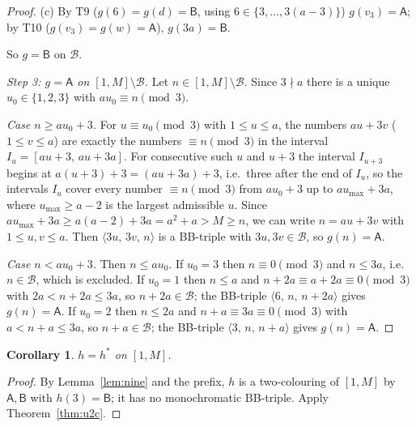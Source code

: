 \documentclass[11pt]{amsart}
\newtheorem{corollary}[theorem]{Corollary}
\theoremstyle{definition}
\theoremstyle{remark}
\newcommand{\cA}{\mathsf{A}}\newcommand{\cB}{\mathsf{B}}\newcommand{\cC}{\mathsf{C}}
\newcommand{\tri}[3]{\langle #1,\,#2,\,#3\rangle}
\newcommand{\Bset}{\mathcal B}
\begin{document}
\begin{proof}
(c) By T9 ($g(6)=g(d)=\cB$, using $6\in\{3,\dots,3(a-3)\}$) $g(v_3)=\cA$; by T10 ($g(v_3)=g(w)=\cA$), $g(3a)=\cB$.

So $g=\cB$ on $\Bset$.

\emph{Step 3: $g=\cA$ on $[1,M]\setminus\Bset$.} Let $n\in[1,M]\setminus\Bset$. Since $3\nmid a$ there is a unique
$u_0\in\{1,2,3\}$ with $au_0\equiv n\pmod3$.

\emph{Case $n\ge au_0+3$.} For $u\equiv u_0\pmod 3$ with $1\le u\le a$, the numbers $au+3v$ ($1\le v\le a$) are
exactly the numbers $\equiv n\pmod 3$ in the interval $I_u=[au+3,\,au+3a]$. For consecutive such $u$ and $u+3$ the
interval $I_{u+3}$ begins at $a(u+3)+3=(au+3a)+3$, i.e.\ three after the end of $I_u$, so the intervals $I_u$
cover every number $\equiv n\pmod3$ from $au_0+3$ up to $au_{\max}+3a$, where $u_{\max}\ge a-2$ is the largest
admissible $u$. Since $au_{\max}+3a\ge a(a-2)+3a=a^2+a>M\ge n$, we can write $n=au+3v$ with $1\le u,v\le a$. Then
$\tri{3u}{3v}{n}$ is a BB-triple with $3u,3v\in\Bset$, so $g(n)=\cA$.

\emph{Case $n<au_0+3$.} Then $n\le au_0$. If $u_0=3$ then $n\equiv0\pmod3$ and $n\le3a$, i.e.\ $n\in\Bset$, which is
excluded. If $u_0=1$ then $n\le a$ and $n+2a\equiv a+2a\equiv0\pmod3$ with $2a<n+2a\le3a$, so $n+2a\in\Bset$; the
BB-triple $\tri{6}{n}{n+2a}$ gives $g(n)=\cA$. If $u_0=2$ then $n\le2a$ and $n+a\equiv3a\equiv0\pmod3$ with
$a<n+a\le3a$, so $n+a\in\Bset$; the BB-triple $\tri{3}{n}{n+a}$ gives $g(n)=\cA$.
\end{proof}

\begin{corollary}\label{cor:hstar}
$h=h^\ast$ on $[1,M]$.
\end{corollary}
\begin{proof}
By Lemma~\ref{lem:nine} and the prefix, $h$ is a two-colouring of $[1,M]$ by $\cA,\cB$ with $h(3)=\cB$; it has no
monochromatic BB-triple. Apply Theorem~\ref{thm:u2c}.
\end{proof}
\end{document}
